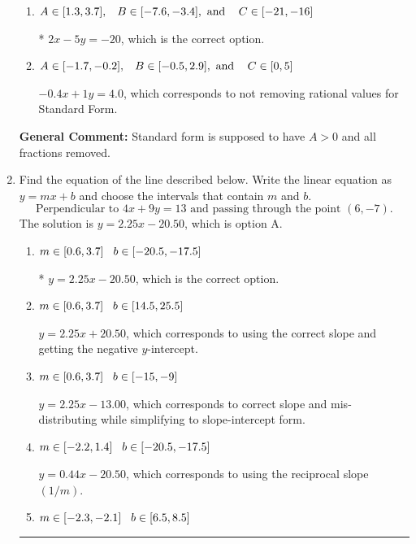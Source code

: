 \documentclass{extbook}[14pt]
\newcommand{\litem}[1]{\item #1

\rule{\textwidth}{0.4pt}}
\begin{document}
\begin{enumerate}
{\begin{enumerate}[label=\Alph*.]
 $2x + 5y = 20$, which corresponds to using the opposite (negative) slope of the graph, but did everything else correctly.
\item \( A \in [1.3, 3.7], \hspace{3mm} B \in [-7.6, -3.4], \text{ and } \hspace{3mm} C \in [-21, -16] \)

* $2x - 5y = -20$, which is the correct option.
\item \( A \in [-1.7, -0.2], \hspace{3mm} B \in [-0.5, 2.9], \text{ and } \hspace{3mm} C \in [0, 5] \)

 $-0.4x + 1y = 4.0$, which corresponds to not removing rational values for Standard Form.
\end{enumerate}

\textbf{General Comment:} Standard form is supposed to have $A > 0$ and all fractions removed.
}
\litem{
Find the equation of the line described below. Write the linear equation as $ y=mx+b $ and choose the intervals that contain $m$ and $b$.
\[ \text{Perpendicular to } 4 x + 9 y = 13 \text{ and passing through the point } (6, -7). \]The solution is \( y = 2.25x - 20.50 \), which is option A.\begin{enumerate}[label=\Alph*.]
\item \( m \in [0.6, 3.7] \hspace*{3mm} b \in [-20.5, -17.5] \)

* $y = 2.25x - 20.50$, which is the correct option.
\item \( m \in [0.6, 3.7] \hspace*{3mm} b \in [14.5, 25.5] \)

 $y = 2.25x + 20.50$, which corresponds to using the correct slope and getting the negative $y$-intercept.
\item \( m \in [0.6, 3.7] \hspace*{3mm} b \in [-15, -9] \)

 $y = 2.25x - 13.00$, which corresponds to correct slope and mis-distributing while simplifying to slope-intercept form.
\item \( m \in [-2.2, 1.4] \hspace*{3mm} b \in [-20.5, -17.5] \)

 $y = 0.44x - 20.50$, which corresponds to using the reciprocal slope $(1/m)$.
\item \( m \in [-2.3, -2.1] \hspace*{3mm} b \in [6.5, 8.5] \)


\end{enumerate}}
\end{enumerate}
\end{document}
